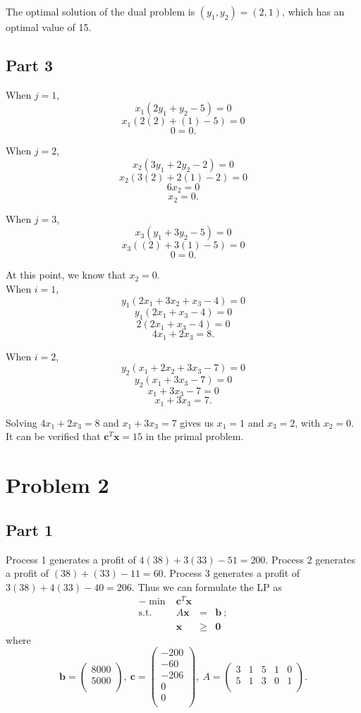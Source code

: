 \documentclass{article}
\begin{document}
The optimal solution of the dual problem is $(y_1, y_2) = (2, 1)$, which has an optimal value of 15.

\subsection{Part 3}

When $j=1$,
$$x_1(2y_1 + y_2 - 5) = 0$$
$$x_1(2(2) + (1) - 5) = 0$$
$$0 = 0.$$

When $j=2$,
$$x_2(3y_1 + 2y_2 - 2) = 0$$
$$x_2(3(2) + 2(1) - 2) = 0$$
$$6x_2 = 0$$
$$x_2 = 0.$$


When $j=3$,
$$x_3(y_1 + 3y_2 - 5) = 0$$
$$x_3((2) + 3(1) - 5) = 0$$
$$0 = 0.$$

At this point, we know that $x_2 = 0$.\\

When $i=1$,
$$y_1(2x_1 + 3x_2 + x_3 - 4) = 0$$
$$y_1(2x_1 + x_3 - 4) = 0$$
$$2(2x_1 + x_3 - 4) = 0$$
$$4x_1 + 2x_3 = 8.$$

When $i=2$,
$$y_2(x_1 + 2x_2 + 3x_3 - 7) = 0$$
$$y_2(x_1 + 3x_3 - 7) = 0$$
$$x_1 + 3x_3 - 7 = 0$$
$$x_1 + 3x_3 = 7.$$

Solving $4x_1 + 2x_3 = 8$ and $x_1 + 3x_3 = 7$ gives us $x_1 = 1$ and $x_3 = 2$, with $x_2 = 0$. It can be verified that $\mathbf{c}^T\mathbf{x} = 15$ in the primal problem.

\section{Problem 2}

\subsection{Part 1}
Process 1 generates a profit of $4(38) + 3(33) - 51 = 200$. Process 2 generates a profit of $(38) + (33) - 11 = 60$. Process 3 generates a profit of $3(38) + 4(33) - 40 = 206$. Thus we can formulate the LP as 
\[
\begin{array}{rrcl}
  - \min & \mathbf{c}^T \mathbf{x}  &      &   \\
 \mbox{s.t.}  &  A\mathbf{x}  &   =  & \mathbf{b}~; \\
      &   \mathbf{x}  & \geq & \mathbf{0}~
\end{array}
\]
where
\[
\mathbf{b} = 
\left(
  \begin{array}{c}
    8000 \\
    5000 \\
  \end{array}
\right), 
~
\mathbf{c} = 
\left(
  \begin{array}{c}
    -200 \\
    -60 \\
    -206 \\
    0 \\
    0 \\
  \end{array}
\right), 
~
A = 
\left(
  \begin{array}{ccccc}
    3 & 1 & 5 & 1 & 0 \\
    5 & 1 & 3 & 0 & 1 \\
  \end{array}
\right).
\]
\end{document}
